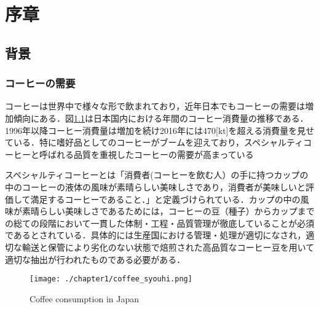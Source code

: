 
\chapter{序章}

\setcounter{page}{1}


\section{背景}

\subsection{コーヒーの需要}
コーヒーは世界中で様々な形で飲まれており，近年日本でもコーヒーの需要は増加傾向にある．図\ref{fig_syouhi}は日本国内における年間のコーヒー消費量の推移である．1996年以降コーヒー消費量は増加を続け2016年には470[kt]を超える消費量を見せている．特に嗜好品としてのコーヒーがブームを迎えており，スペシャルティコーヒーと呼ばれる品質を重視したコーヒーの需要が高まっている

スペシャルティコーヒーとは「消費者(コーヒーを飲む人）の手に持つカップの中のコーヒーの液体の風味が素晴らしい美味しさであり，消費者が美味しいと評価して満足するコーヒーであること．」と定義づけられている．カップの中の風味が素晴らしい美味しさであるためには，コーヒーの豆（種子）からカップまでの総ての段階において一貫した体制・工程・品質管理が徹底していることが必須であるとされている．具体的には生産国における管理・処理が適切になされ，適切な輸送と保管により劣化のない状態で焙煎された高品質なコーヒー豆を用いて適切な抽出が行われたものである必要がある．
\begin{figure}[]
  \begin{center}
    \texttt{[image: ./chapter1/coffee\_syouhi.png]}
    \caption{Coffee consumption in Japan}
    \label{fig_syouhi}
  \end{center}
\end{figure}

